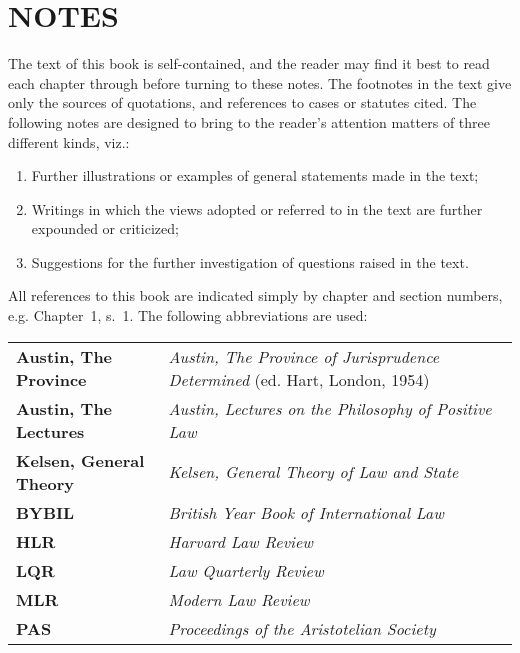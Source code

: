 \documentclass[12pt,oneside]{book}  %
\begin{document}
\newpage

\section{NOTES}

The text of this book is self-contained, and the reader may find it best to read each chapter through before turning to these notes. The footnotes in the text give only the sources of quotations, and references to cases or statutes cited. The following notes are designed to bring to the reader's attention matters of three different kinds, viz.:

\begin{enumerate}[label=(\roman*)]
  \item Further illustrations or examples of general statements made in the text;
  \item Writings in which the views adopted or referred to in the text are further expounded or criticized;
  \item Suggestions for the further investigation of questions raised in the text.
\end{enumerate}

All references to this book are indicated simply by chapter and section numbers, e.g. Chapter~1, s.~1. The following abbreviations are used:

\vspace{1em}

\begin{tabular}{@{}l p{10cm}@{}}
\textbf{Austin, The Province}   & \textit{Austin, The Province of Jurisprudence Determined} (ed. Hart, London, 1954) \\
\textbf{Austin, The Lectures}   & \textit{Austin, Lectures on the Philosophy of Positive Law} \\
\textbf{Kelsen, General Theory} & \textit{Kelsen, General Theory of Law and State} \\
\textbf{BYBIL}                  & \textit{British Year Book of International Law} \\
\textbf{HLR}                    & \textit{Harvard Law Review} \\
\textbf{LQR}                    & \textit{Law Quarterly Review} \\
\textbf{MLR}                    & \textit{Modern Law Review} \\
\textbf{PAS}                    & \textit{Proceedings of the Aristotelian Society} \\
\end{tabular}
\end{document}

